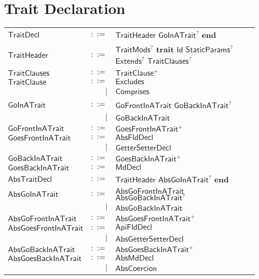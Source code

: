 \section{Trait Declaration} 

 
\begin{longtable}[l]{p{3cm}rl}
$\mathsf{TraitDecl}$ &  $\mathsf{::=}$  & $\mathsf{TraitHeader}$ $\mathsf{GoInATrait}$$^?$ $\mathbf{end}$ \\
$\mathsf{TraitHeader}$ &  $\mathsf{::=}$  & $\mathsf{TraitMods}$$^?$ $\mathbf{trait}$ $\mathsf{Id}$ $\mathsf{StaticParams}$$^?$ $\mathsf{Extends}$$^?$ $\mathsf{TraitClauses}$$^?$ \\
$\mathsf{TraitClauses}$ &  $\mathsf{::=}$  & $\mathsf{TraitClause}$$^+$ \\
$\mathsf{TraitClause}$ &  $\mathsf{::=}$  & $\mathsf{Excludes}$ \\
 & $\big|$ &  $\mathsf{Comprises}$ \\
$\mathsf{GoInATrait}$ &  $\mathsf{::=}$  & $\mathsf{GoFrontInATrait}$ $\mathsf{GoBackInATrait}$$^?$ \\
 & $\big|$ &  $\mathsf{GoBackInATrait}$ \\
$\mathsf{GoFrontInATrait}$ &  $\mathsf{::=}$  & $\mathsf{GoesFrontInATrait}$$^+$ \\
$\mathsf{GoesFrontInATrait}$ &  $\mathsf{::=}$  & $\mathsf{AbsFldDecl}$ \\
 & $\big|$ &  $\mathsf{GetterSetterDecl}$ \\
$\mathsf{GoBackInATrait}$ &  $\mathsf{::=}$  & $\mathsf{GoesBackInATrait}$$^+$ \\
$\mathsf{GoesBackInATrait}$ &  $\mathsf{::=}$  & $\mathsf{MdDecl}$ \\
$\mathsf{AbsTraitDecl}$ &  $\mathsf{::=}$  & $\mathsf{TraitHeader}$ $\mathsf{AbsGoInATrait}$$^?$ $\mathbf{end}$ \\
$\mathsf{AbsGoInATrait}$ &  $\mathsf{::=}$  & $\mathsf{AbsGoFrontInATrait}$ $\mathsf{AbsGoBackInATrait}$$^?$ \\
 & $\big|$ &  $\mathsf{AbsGoBackInATrait}$ \\
$\mathsf{AbsGoFrontInATrait}$ &  $\mathsf{::=}$  & $\mathsf{AbsGoesFrontInATrait}$$^+$ \\
$\mathsf{AbsGoesFrontInATrait}$ &  $\mathsf{::=}$  & $\mathsf{ApiFldDecl}$ \\
 & $\big|$ &  $\mathsf{AbsGetterSetterDecl}$ \\
$\mathsf{AbsGoBackInATrait}$ &  $\mathsf{::=}$  & $\mathsf{AbsGoesBackInATrait}$$^+$ \\
$\mathsf{AbsGoesBackInATrait}$ &  $\mathsf{::=}$  & $\mathsf{AbsMdDecl}$ \\
 & $\big|$ &  $\mathsf{AbsCoercion}$ \\
\end{longtable} \hfill 

